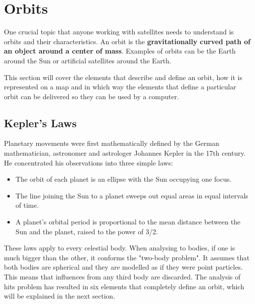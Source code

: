 

\chapter{Orbits}



One crucial topic that anyone working with satellites needs to understand is orbits and their characteristics. An orbit is the \textbf{gravitationally curved path of an object around a center of mass}. Examples of orbits can be the Earth around the Sun or artificial satellites around the Earth.

This section will cover the elements that describe and define an orbit, how it is represented on a map and in which way the elements that define a particular orbit can be delivered so they can be used by a computer.


\section{Kepler's Laws}\label{2.1}
Planetary movements were first mathematically defined by the German mathematician, astronomer and astrologer Johannes Kepler in the 17th century. He concentrated his observations into three simple laws\citep{SSEng}:
\begin{itemize}

\item The orbit of each planet is an ellipse with the Sun occupying one focus.
\item The line joining the Sun to a planet sweeps out equal areas in equal intervals of time.
\item A planet's orbital period is proportional to the mean distance between the Sun and the planet, raised to the power of 3/2.
\end{itemize} 

These laws apply to every celestial body. When analysing to bodies, if one is much bigger than the other, it conforms the "two-body problem". It assumes that both bodies are spherical and they are modelled as if they were point particles. This means that influences from any third body are discarded. The analysis of hits problem has resulted in six elements that completely define an orbit, which will be explained in the next section.


\pagebreak
